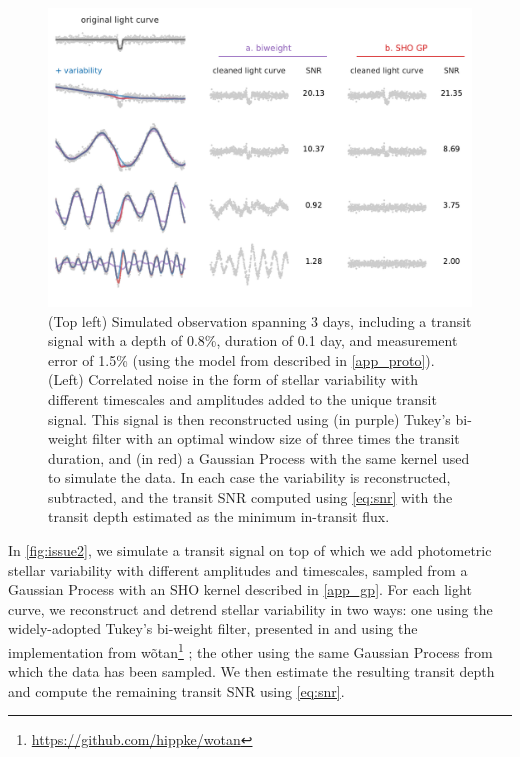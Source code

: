 \documentclass{aastex631}
\begin{document}
\begin{figure}[H]
    \begin{centering}
        \includegraphics[width=0.85\linewidth]{issue2.pdf}
        \caption{(Top left) Simulated observation spanning 3 days, including a transit signal with a depth of 0.8\%, duration of 0.1 day, and measurement error of 1.5\% (using the model from \cite{protopapas} described in \autoref{app_proto}). (Left) Correlated noise in the form of stellar variability with different timescales and amplitudes added to the unique transit signal. This signal is then reconstructed using (in purple) Tukey's bi-weight filter \citep{wotan} with an optimal window size of three times the transit duration, and (in red) a Gaussian Process with the same kernel used to simulate the data. In each case the variability is reconstructed, subtracted, and the transit SNR computed using \autoref{eq:snr} with the transit depth estimated as the minimum in-transit flux.}
        \label{fig:issue2}
    \end{centering}
\end{figure}

In \autoref{fig:issue2}, we simulate a transit signal on top of which we add photometric stellar variability with different amplitudes and timescales, sampled from a Gaussian Process with an SHO kernel described in \autoref{app_gp}. For each light curve, we reconstruct and detrend stellar variability in two ways: one using the widely-adopted Tukey's bi-weight filter, presented in \cite{tukey} and using the implementation from \textsf{wõtan}\footnote{\href{https://github.com/hippke/wotan}{https://github.com/hippke/wotan}} \citep{wotan}; the other using the same Gaussian Process from which the data has been sampled. We then estimate the resulting transit depth and compute the remaining transit SNR using \autoref{eq:snr}. 
\end{document}
